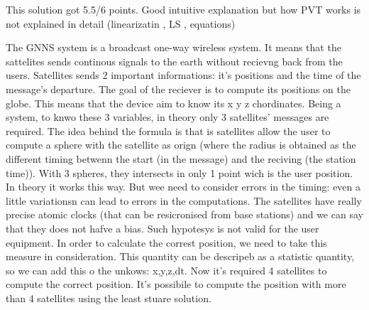 \begin{solution}
    This solution got 5.5/6 points. Good intuitive explanation but how PVT works is not explained in detail (linearizatin , LS , equations)

    The GNNS system is a broadcast one-way wireless system. It means that the sattelites sends continous signals to the earth without recievng back from the users. Satellites sends 2 important informations: it's positions and the time of the message's departure.
    The goal of the reciever is to compute its positions on the globe. This means that the device aim to know its x y z chordinates. Being a system, to knwo these 3 variables, in theory only 3 satellites' messages are required. The idea behind the formula is that is satellites allow the user to compute a sphere with the satellite as orign (where the radius is obtained as the different timing betwenn the start (in the message) and the reciving (the station time)). With 3 spheres, they intersects in only 1 point wich is the user position. In theory it works this way. But wee need to consider errors in the timing: even a little variationsn can lead to errors in the computations. The satellites have really precise atomic clocks (that can be resicronised from base stations) and we can say that they does not hafve a bias. Such hypotesys is not valid for the user equipment. In order to calculate the correst position, we need to take this measure in consideration. This quantity can be descripeb as a statistic quantity, so we can add this o the unkows: x,y,z,dt. Now it's required 4 satellites to compute the correct position.
    It's possibile to compute the position with more than 4 satellites using the least stuare solution.

\end{solution}

